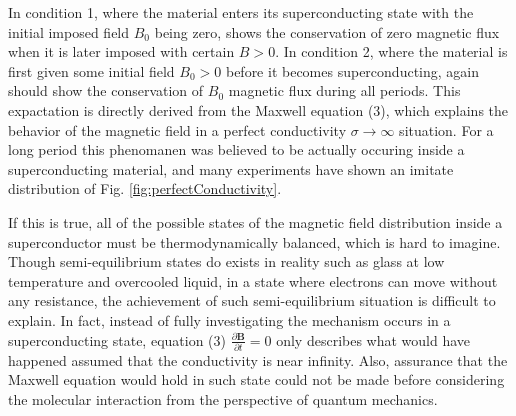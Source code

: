 In condition 1, where the material enters its superconducting state with the initial imposed field $B_0$ being zero,
shows the conservation of zero magnetic flux when it is later imposed with certain $B > 0$.
In condition 2, where the material is first given some initial field $B_0 > 0$ before it becomes superconducting,
again should show the conservation of $B_0$ magnetic flux during all periods.
This expactation is directly derived from the Maxwell equation (3), which explains the behavior of the magnetic field in a perfect conductivity $\sigma \to \infty$ situation.
For a long period this phenomanen was believed to be actually occuring inside a superconducting material,
and many experiments have shown an imitate distribution of Fig. \ref{fig:perfectConductivity}.

If this is true, all of the possible states of the magnetic field distribution inside a superconductor must be thermodynamically balanced,
which is hard to imagine.
Though semi-equilibrium states do exists in reality such as glass at low temperature and overcooled liquid,
in a state where electrons can move without any resistance,
the achievement of such semi-equilibrium situation is difficult to explain.
In fact, instead of fully investigating the mechanism occurs in a superconducting state,
equation (3) $\frac{\partial{\bm B}}{\partial t} = 0$ only describes what would have happened assumed that the conductivity is near infinity.
Also, assurance that the Maxwell equation would hold in such state could not be made before considering the molecular interaction from the perspective of quantum mechanics.



